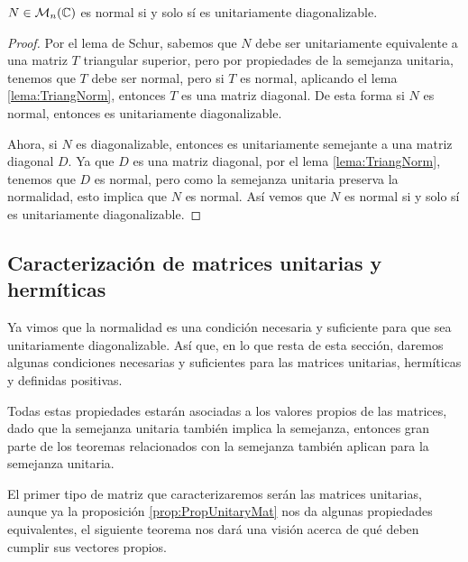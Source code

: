 \begin{teor}\label{teor:CaracMatNorm}
  $N \in \mathcal{M}_n(\mathbb{C})$ es normal si y solo sí es unitariamente diagonalizable.
\end{teor}
\begin{proof}
  Por el lema de Schur, sabemos que $N$ debe ser unitariamente equivalente a una matriz $T$ triangular superior, pero por propiedades de la semejanza unitaria, tenemos que $T$ debe ser normal, pero si $T$ es normal, aplicando el lema \ref{lema:TriangNorm}, entonces $T$ es una matriz diagonal. De esta forma si $N$ es normal, entonces es unitariamente diagonalizable.

  Ahora, si $N$ es diagonalizable, entonces es unitariamente semejante a una matriz diagonal $D$. Ya que $D$ es una matriz diagonal, por el lema \ref{lema:TriangNorm}, tenemos que $D$ es normal, pero como la semejanza unitaria preserva la normalidad, esto implica que $N$ es normal. Así vemos que $N$ es normal si y solo sí es unitariamente diagonalizable.
\end{proof}


\subsection{Caracterización de matrices unitarias y hermíticas}

Ya vimos que la normalidad es una condición necesaria y suficiente para que sea unitariamente diagonalizable. Así que, en lo que resta de esta sección, daremos algunas condiciones necesarias y suficientes para las matrices unitarias, hermíticas y definidas positivas.

Todas estas propiedades estarán asociadas a los valores propios de las matrices, dado que la semejanza unitaria también implica la semejanza, entonces gran parte de los teoremas relacionados con la semejanza también aplican para la semejanza unitaria.

El primer tipo de matriz que caracterizaremos serán las matrices unitarias, aunque ya la proposición \ref{prop:PropUnitaryMat} nos da algunas propiedades equivalentes, el siguiente teorema nos dará una visión acerca de qué deben cumplir sus vectores propios.

